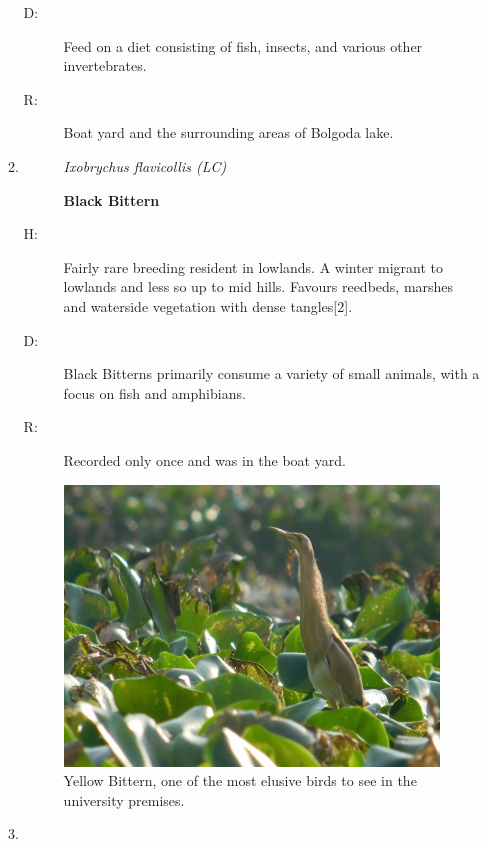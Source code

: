 \begin{itemize}
\begin{enumerate}
\begin{description}
\item[D: ]%
Feed on a diet consisting of fish, insects, and various other invertebrates.%
\item[R: ]%
Boat yard and the surrounding areas of Bolgoda lake.%
\end{description}%
\item%
\begin{description}%
\item[]%
\textit{Ixobrychus flavicollis (LC)}%
\item[]%
\textbf{Black Bittern}%
\end{description}%
\begin{description}%
\item[H: ]%
Fairly rare breeding resident in lowlands. A winter migrant to lowlands and less so up to mid hills. Favours reedbeds, marshes and waterside vegetation with dense tangles{[}2{]}.%
\item[D: ]%
Black Bitterns primarily consume a variety of small animals, with a focus on fish and amphibians.%
\item[R: ]%
Recorded only once and was in the boat yard.%
\end{description}%
\vspace*{\fill} %
\begin{figure}[!htpb]
    \centering
    \includegraphics[width=\linewidth]{Figures/yellow-bittern.JPG}
    \caption[]{Yellow Bittern, one of the most elusive birds to see in the university premises.}
    \label{fig:figure-01}
\end{figure}
\newpage
\item%

\end{enumerate}
\end{itemize}
